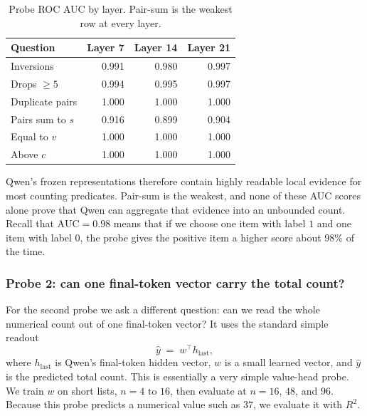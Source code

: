 \documentclass[10pt]{article}
\theoremstyle{definition}
\begin{document}
\begin{table}[htbp]
\centering
\caption{Probe ROC AUC by layer. Pair-sum is the weakest row at every
layer.}
\label{tab:auc}
\begin{tabular}{@{}lrrr@{}}
\toprule
\textbf{Question} & \textbf{Layer 7} & \textbf{Layer 14} & \textbf{Layer 21} \\
\midrule
Inversions       & 0.991 & 0.980 & 0.997 \\
Drops $\geq 5$   & 0.994 & 0.995 & 0.997 \\
Duplicate pairs  & 1.000 & 1.000 & 1.000 \\
Pairs sum to $s$ & 0.916 & 0.899 & 0.904 \\
Equal to $v$     & 1.000 & 1.000 & 1.000 \\
Above $c$        & 1.000 & 1.000 & 1.000 \\
\bottomrule
\end{tabular}
\end{table}

Qwen's frozen representations therefore contain highly readable local
evidence for most counting predicates. Pair-sum is the weakest, and none of
these AUC scores alone prove that Qwen can aggregate that evidence into an
unbounded count. Recall that $\mathrm{AUC} = 0.98$ means that if we choose
one item with label $1$ and one item with label $0$, the probe gives the
positive item a higher score about $98\%$ of the time.

\subsubsection*{Probe 2: can one final-token vector carry the total count?}

For the second probe we ask a different question: can we read the whole
numerical count out of one final-token vector? It uses the standard simple
readout
\begin{equation}
\hat{y} \;=\; w^{\top} h_{\text{last}},
\label{eq:probe2}
\end{equation}
where $h_{\text{last}}$ is Qwen's final-token hidden vector, $w$ is a
small learned vector, and $\hat{y}$ is the predicted total count. This is
essentially a very simple value-head probe. We train $w$ on short lists,
$n = 4$ to $16$, then evaluate at $n = 16$, $48$, and $96$. Because this
probe predicts a numerical value such as $37$, we evaluate it with $R^2$.
\end{document}
